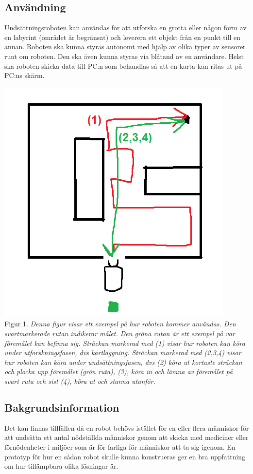 \documentclass[11pt]{article}
\begin{document}
\begin{flushleft}
\subsection{Användning}
Undsättningsroboten kan användas för att utforska en grotta eller någon form av en labyrint (området är begränsat) och leverera ett objekt från en punkt till en annan. 
Roboten ska kunna styras autonomt med hjälp av olika typer av sensorer runt om roboten. Den ska även kunna styras via blåtand av en användare. 
Helst ska roboten skicka data till PC:n som behandlas så att en karta kan ritas ut på PC:ns skärm.
\begin{center}
\includegraphics[scale=0.7]{anvandnings_exempel}\\
Figur 1. \textit{Denna figur visar ett exempel på hur roboten kommer användas. Den svartmarkerade rutan indikerar målet. Den gröna rutan är ett exempel på var föremålet kan befinna sig. Sträckan markerad med (1) visar hur roboten kan köra under utforskningsfasen, dvs kartläggning. Sträckan markerad med (2,3,4) visar hur roboten kan köra under undsättningsfasen, dvs (2) köra ut kortaste sträckan och plocka upp föremålet (grön ruta), (3), köra in och lämna av föremålet på svart ruta och sist (4), köra ut och stanna utanför.}
\end{center}
\pagebreak
\subsection{Bakgrundsinformation}
Det kan finnas tillfällen då en robot behövs istället för en eller flera människor för att undsätta ett antal nödställda människor genom att skicka med mediciner eller förnödenheter i miljöer som är för farliga för människor att ta sig igenom. En prototyp för hur en sådan robot skulle kunna konstrueras ger en bra uppfattning om hur tillämpbara olika lösningar är.


\end{flushleft}
\end{document}
